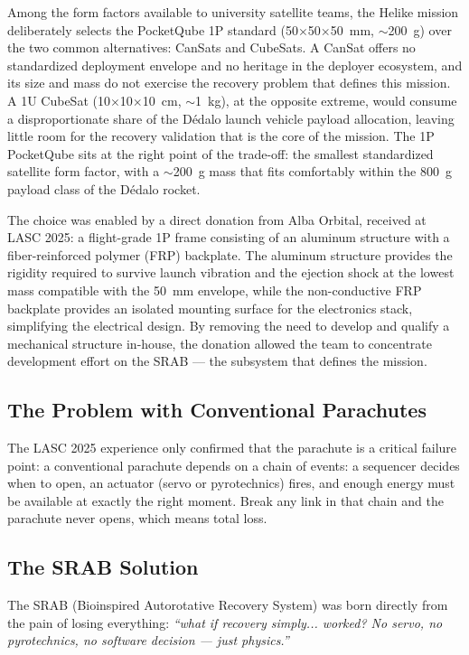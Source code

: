 Among the form factors available to university satellite teams, the
Helike mission deliberately selects the PocketQube 1P standard
(50$\times$50$\times$50~mm, $\sim$200~g) over the two common
alternatives: CanSats and CubeSats. A CanSat offers no standardized
deployment envelope and no heritage in the deployer ecosystem, and its
size and mass do not exercise the recovery problem that defines this
mission. A 1U CubeSat (10$\times$10$\times$10~cm, $\sim$1~kg), at the
opposite extreme, would consume a disproportionate share of the
Dédalo launch vehicle payload allocation, leaving little room for the
recovery validation that is the core of the mission. The 1P
PocketQube sits at the right point of the trade-off: the smallest
standardized satellite form factor, with a $\sim$200~g mass that fits
comfortably within the 800~g payload class of the Dédalo rocket.

The choice was enabled by a direct donation from Alba Orbital,
received at LASC 2025: a flight-grade 1P frame consisting of an
aluminum structure with a fiber-reinforced polymer (FRP) backplate.
The aluminum structure provides the rigidity required to survive
launch vibration and the ejection shock at the lowest mass compatible
with the 50~mm envelope, while the non-conductive FRP backplate
provides an isolated mounting surface for the electronics stack,
simplifying the electrical design. By removing the need to develop
and qualify a mechanical structure in-house, the donation allowed the
team to concentrate development effort on the SRAB --- the subsystem
that defines the mission.

\subsection{The Problem with Conventional Parachutes}

The LASC 2025 experience only confirmed that the parachute is a
critical failure point: a conventional parachute depends on a chain of events: a
sequencer decides when to open, an actuator (servo or pyrotechnics)
fires, and enough energy must be available at exactly the right
moment. Break any link in that chain and the parachute never opens,
which means total loss.

\subsection{The SRAB Solution}

The SRAB (Bioinspired Autorotative Recovery System) was born directly
from the pain of losing everything: \emph{``what if recovery simply...
worked? No servo, no pyrotechnics, no software decision — just
physics.''}

